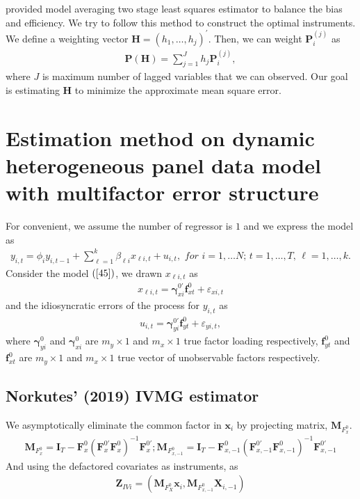 \documentclass[12pt,a4paper,hyperref]{article}
\begin{document}
\citet{Kuersteiner:2010} provided model averaging two stage least squares estimator to balance the bias and efficiency. We try to follow this method to construct the optimal instruments. We define a weighting vector $\boldsymbol{H}=\left(h_{1}, \ldots, h_{j} \right)^{'}$. Then, we can weight $\boldsymbol{P}^{(j)}_{i}$ as
\begin{align}
\boldsymbol{P}\left(\boldsymbol{H} \right)= \sum^{J}_{j=1}h_{j} \boldsymbol{P}^{(j)}_{i},
\end{align}
where $J$ is maximum number of lagged variables that we can observed. 
Our goal is estimating $\boldsymbol{H}$ to minimize the approximate mean square error. 










\section{Estimation method on dynamic heterogeneous panel data model with  multifactor error structure}
For convenient, we assume the number of regressor is $1$ and we express the model as
\begin{align}
y_{i,t}=\phi_{i} y_{i,t-1}+ \sum^{k}_{\ell=1}\beta_{\ell i}x_{\ell i,t}+u_{i,t}, \,\, for\,\,i=1,\ldots N;\,t=1,\ldots,T, \, \ell=1,\ldots, k. \label{46}
\end{align}
Consider the model $(\ref{45})$, we drawn $x_{\ell i,t}$ as
\begin{align}
x_{\ell i,t}=\boldsymbol{\gamma}^{0'}_{xi}\boldsymbol{f}^{0}_{xt}+\varepsilon_{xi,t}
\end{align}
and the idiosyncratic errors of the process for $y_{i,t}$ as
\begin{align}
u_{i,t}=\boldsymbol{\gamma}^{0'}_{yi}\boldsymbol{f}^{0}_{yt}+\varepsilon_{yi,t},
\end{align}
where $\boldsymbol{\gamma}^{0}_{yi}$ and $\boldsymbol{\gamma}^{0}_{xi}$ are $m_{y}\times 1$ and $m_{x}\times 1$ true
 factor loading respectively, $\boldsymbol{f}^{0}_{yt}$  and  $\boldsymbol{f}^{0}_{xt}$ are  $m_{y}\times 1$ and $m_{x}\times 1$ true vector of unobservable factors respectively.
\subsection{Norkutes' (2019) IVMG estimator}
 We asymptotically eliminate the common factor in $\boldsymbol{x}_{i}$ by projecting matrix, $\boldsymbol{M}_{F^{0}_{x}}$.
 \begin{align}
 \boldsymbol{M}_{F^{0}_{x}}=\boldsymbol{I}_{T}-\boldsymbol{F}^{0}_{x}\left(\boldsymbol{F}^{0'}_{x}\boldsymbol{F}^{0}_{x}  \right)^{-1}\boldsymbol{F}^{0'}_{x} ; \boldsymbol{M}_{F^{0}_{x,-1}}=\boldsymbol{I}_{T}-\boldsymbol{F}^{0}_{x,-1}\left(\boldsymbol{F}^{0'}_{x,-1}\boldsymbol{F}^{0}_{x,-1}  \right)^{-1}\boldsymbol{F}^{0'}_{x,-1}
 \end{align}
And using the defactored covariates as instruments, as
\begin{align}
\boldsymbol{Z}_{IVi}=\left(\boldsymbol{M}_{F^{0}_{X}}\boldsymbol{x}_{i}, \boldsymbol{M}_{F^{0}_{x,-1}}\boldsymbol{X}_{i,-1}  \right)
\end{align}
\end{document}
